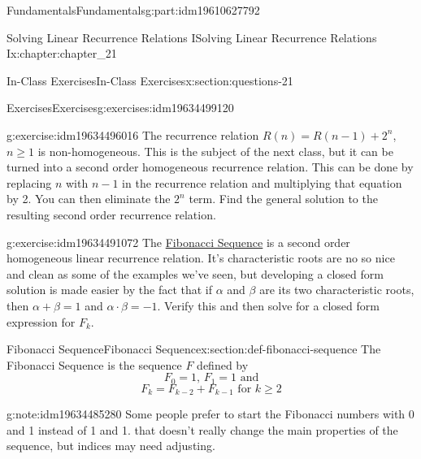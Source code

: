 \documentclass[oneside,10pt,]{book}
\numberwithin{equation}{section}
\begin{document}
\begin{partptx}{Fundamentals}{}{Fundamentals}{}{}{g:part:idm19610627792}
\begin{chapterptx}{Solving Linear Recurrence Relations I}{}{Solving Linear Recurrence Relations I}{}{}{x:chapter:chapter_21}
\begin{sectionptx}{In-Class Exercises}{}{In-Class Exercises}{}{}{x:section:questions-21}
\begin{exercises-subsection-numberless}{Exercises}{}{Exercises}{}{}{g:exercises:idm19634499120}
\begin{exercisegroup}
\begin{divisionexerciseeg}{3}{}{}{g:exercise:idm19634496016}
The recurrence relation \(R(n)=R(n-1)+2^n\), \(n \geq 1\) is non-homogeneous.  This is the subject of the next class, but it can be turned into a second order homogeneous recurrence relation.  This can be done by replacing \(n\) with \(n-1\) in the recurrence relation and multiplying that equation by 2.   You can then eliminate the \(2^n\) term. Find the general solution to the resulting second order recurrence relation.%
\end{divisionexerciseeg}%
\begin{divisionexerciseeg}{4}{}{}{g:exercise:idm19634491072}%
The \hyperref[x:section:def-fibonacci-sequence]{Fibonacci Sequence}  is a second order homogeneous linear recurrence relation. It's characteristic roots are no so nice and clean as some of the examples we've seen, but developing a closed form solution is made easier by the fact that if \(\alpha\) and \(\beta\) are its two characteristic roots, then \(\alpha + \beta = 1\) and \(\alpha \cdot \beta =-1\).  Verify this and then solve for a closed form expression for \(F_k\).%
\end{divisionexerciseeg}%
\end{exercisegroup}
\par\medskip\noindent
\end{exercises-subsection-numberless}
\end{sectionptx}
%
%
\typeout{************************************************}
\typeout{************************************************}
%
\begin{sectionptx}{Fibonacci Sequence}{}{Fibonacci Sequence}{}{}{x:section:def-fibonacci-sequence}
%
The Fibonacci Sequence is the sequence \(F\) defined by%
\begin{equation*}
F_0= 1 \textrm{, } F_1= 1\textrm{ and}
\end{equation*}
%
\begin{equation*}
F_k = F_{k-2} + F_{k-1} \textrm{ for }k\geq 2
\end{equation*}
%
\begin{note}{}{g:note:idm19634485280}%
Some people prefer to start the Fibonacci numbers with 0 and 1 instead of 1 and 1.  that doesn't really change the main properties of the sequence, but indices may need adjusting.%
\end{note}

\end{sectionptx}
\end{chapterptx}
\end{partptx}
\end{document}

